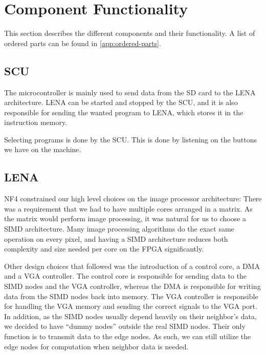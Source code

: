 \section{Component Functionality}

This section describes the different components and their functionality. A list
of ordered parts can be found in \ref{app:ordered-parts}.
\subsection{SCU}

The microcontroller is mainly used to send data from the \ac{SD} card to the
\ac{LENA} architecture. \ac{LENA} can be started and stopped by the \ac{SCU}, and
it is also responsible for sending the wanted program to \ac{LENA}, which stores
it in the instruction memory.

Selecting programs is done by the \ac{SCU}. This is done by listening on the
buttons we have on the machine.

\subsection{LENA}

NF4 constrained our high level choices on the image processor architecture:
There was a requirement that we had to have multiple cores arranged in a
matrix. As the matrix would perform image processing, it was natural for us to
choose a \ac{SIMD} architecture. Many image processing algorithms do the exact
same operation on every pixel, and having a \ac{SIMD} architecture reduces both
complexity and size needed per core on the \ac{FPGA} significantly.

Other design choices that followed was the introduction of a control core, a
\ac{DMA} and a \ac{VGA} controller. The control core is responsible for sending
data to the \ac{SIMD} nodes and the \ac{VGA} controller, whereas the \ac{DMA} is
responsible for writing data from the \ac{SIMD} nodes back into memory. The
\ac{VGA} controller is responsible for handling the \ac{VGA} memory and sending
the correct signals to the \ac{VGA} port. In addition, as the \ac{SIMD} nodes
usually depend heavily on their neighbor's data, we decided to have ``dummy
nodes'' outside the real \ac{SIMD} nodes. Their only function is to transmit
data to the edge nodes. As such, we can still utilize the edge nodes for
computation when neighbor data is needed.

